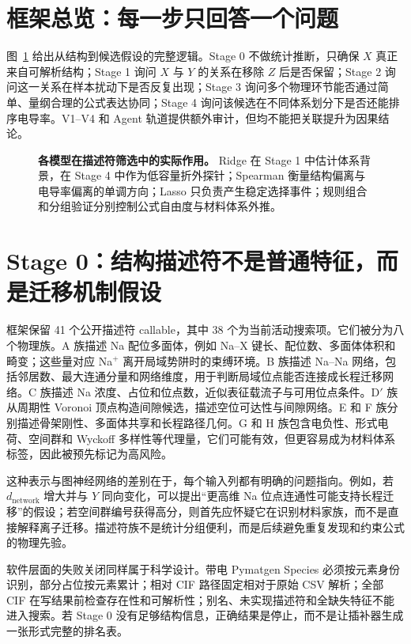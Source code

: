 \section{框架总览：每一步只回答一个问题}

图~\ref{fig:modelroles} 给出从结构到候选假设的完整逻辑。Stage 0 不做统计推断，只确保 $X$ 真正来自可解析结构；Stage 1 询问 $X$ 与 $Y$ 的关系在移除 $Z$ 后是否保留；Stage 2 询问这一关系在样本扰动下是否反复出现；Stage 3 询问多个物理环节能否通过简单、量纲合理的公式表达协同；Stage 4 询问该候选在不同体系划分下是否还能排序电导率。V1--V4 和 Agent 轨道提供额外审计，但均不能把关联提升为因果结论。

\begin{figure}[htbp]
\centering
\resizebox{\textwidth}{!}{}
\caption{\textbf{各模型在描述符筛选中的实际作用。} Ridge 在 Stage 1 中估计体系背景，在 Stage 4 中作为低容量折外探针；Spearman 衡量结构偏离与电导率偏离的单调方向；Lasso 只负责产生稳定选择事件；规则组合和分组验证分别控制公式自由度与材料体系外推。}
\label{fig:modelroles}
\end{figure}

\section{Stage 0：结构描述符不是普通特征，而是迁移机制假设}

框架保留 41 个公开描述符 callable，其中 38 个为当前活动搜索项。它们被分为八个物理族。A 族描述 Na 配位多面体，例如 Na--X 键长、配位数、多面体体积和畸变；这些量对应 Na$^+$ 离开局域势阱时的束缚环境。B 族描述 Na--Na 网络，包括邻居数、最大连通分量和网络维度，用于判断局域位点能否连接成长程迁移网络。C 族描述 Na 浓度、占位和位点数，近似表征载流子与可用位点条件。D$'$ 族从周期性 Voronoi 顶点构造间隙候选，描述空位可达性与间隙网络。E 和 F 族分别描述骨架刚性、多面体共享和长程路径几何。G 和 H 族包含电负性、形式电荷、空间群和 Wyckoff 多样性等代理量，它们可能有效，但更容易成为材料体系标签，因此被预先标记为高风险。

这种表示与图神经网络的差别在于，每个输入列都有明确的问题指向。例如，若 $d_{\mathrm{network}}$ 增大并与 $Y$ 同向变化，可以提出“更高维 Na 位点连通性可能支持长程迁移”的假设；若空间群编号获得高分，则首先应怀疑它在识别材料家族，而不是直接解释离子迁移。描述符族不是统计分组便利，而是后续避免重复发现和约束公式的物理先验。

软件层面的失败关闭同样属于科学设计。带电 Pymatgen Species 必须按元素身份识别，部分占位按元素累计；相对 CIF 路径固定相对于原始 CSV 解析；全部 CIF 在写结果前检查存在性和可解析性；别名、未实现描述符和全缺失特征不能进入搜索。若 Stage 0 没有足够结构信息，正确结果是停止，而不是让插补器生成一张形式完整的排名表。

